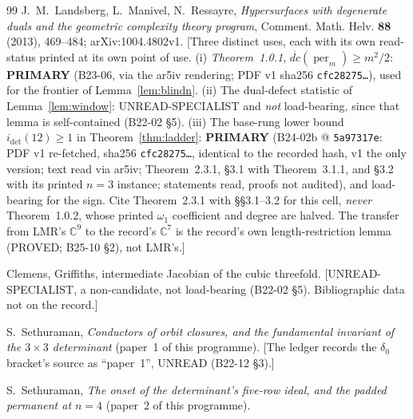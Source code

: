 \documentclass[11pt]{amsart}
\theoremstyle{plain}
\theoremstyle{definition}
\theoremstyle{remark}
\DeclareMathOperator{\per}{per}
\newcommand{\bC}{\mathbb{C}}
\newcommand{\cm}[1]{\texttt{#1}}
\begin{document}
\begin{thebibliography}{99}
 J.~M.~Landsberg, L.~Manivel, N.~Ressayre, \emph{Hypersurfaces with degenerate duals
and the geometric complexity theory program}, Comment. Math. Helv. \textbf{88} (2013), 469--484;
arXiv:1004.4802v1. [Three distinct uses, each with its own read-status printed at its
own point of use. (i) \emph{Theorem~1.0.1}, $\overline{dc}(\per_m)\ge m^2/2$: \textbf{PRIMARY}
(B23-06, via the ar5iv rendering; PDF v1 sha256 \texttt{cfc28275\dots}), used for the frontier of
Lemma~\ref{lem:blindn}. (ii) The dual-defect statistic of Lemma~\ref{lem:window}:
UNREAD-SPECIALIST and \emph{not} load-bearing, since that lemma is self-contained (B22-02 \S5).
(iii) The base-rung lower bound $i_{\det}(12)\ge1$ in Theorem~\ref{thm:ladder}:
\textbf{PRIMARY} (B24-02b @ \cm{5a97317e}: PDF v1 re-fetched, sha256 \texttt{cfc28275\dots},
identical to the recorded hash, v1 the only version; text read via ar5iv; Theorem~2.3.1, \S3.1
with Theorem~3.1.1, and \S3.2 with its printed $n=3$ instance; statements read, proofs not
audited), and load-bearing for the sign. Cite Theorem~2.3.1 with \S\S3.1--3.2 for this cell,
\emph{never} Theorem~1.0.2, whose printed $\omega_1$ coefficient and degree are halved. The
transfer from LMR's $\bC^9$ to the record's $\bC^7$ is the record's own length-restriction lemma
(PROVED; B25-10 \S2), not LMR's.]

 Clemens, Griffiths, intermediate Jacobian of the cubic threefold.
[UNREAD-SPECIALIST, a non-candidate, not load-bearing (B22-02 \S5). Bibliographic data not on the
record.]

 S.~Sethuraman, \emph{Conductors of orbit closures, and the fundamental invariant
of the $3\times3$ determinant} (paper~1 of this programme). [The ledger records the
$\delta_0$ bracket's source as ``paper~1'', UNREAD (B22-12 \S3).]

 S.~Sethuraman, \emph{The onset of the determinant's five-row ideal, and the
padded permanent at $n=4$} (paper~2 of this programme).

\end{thebibliography}
\end{document}
